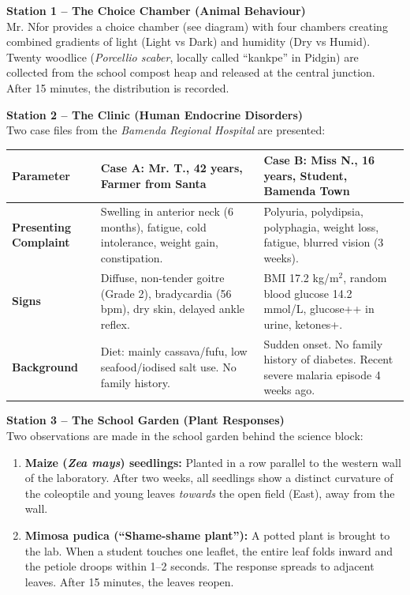 \documentclass[11pt]{article}
\begin{document}
\vspace{0.5cm}
\noindent\textbf{Station 1 -- The Choice Chamber (Animal Behaviour)}\\
Mr. Nfor provides a choice chamber (see diagram) with four chambers creating combined gradients of light (Light vs Dark) and humidity (Dry vs Humid). Twenty woodlice (\emph{Porcellio scaber}, locally called ``kankpe'' in Pidgin) are collected from the school compost heap and released at the central junction. After 15 minutes, the distribution is recorded.

\vspace{0.3cm}
\noindent\textbf{Station 2 -- The Clinic (Human Endocrine Disorders)}\\
Two case files from the \emph{Bamenda Regional Hospital} are presented:

\begin{center}
\begin{tabularx}{\linewidth}{|l|X|X|}\hline
\rowcolor{popblueL}
\textbf{Parameter} & \textbf{Case A: Mr. T., 42 years, Farmer from Santa} & \textbf{Case B: Miss N., 16 years, Student, Bamenda Town} \\\hline
\textbf{Presenting Complaint} & Swelling in anterior neck (6 months), fatigue, cold intolerance, weight gain, constipation. & Polyuria, polydipsia, polyphagia, weight loss, fatigue, blurred vision (3 weeks). \\\hline
\textbf{Signs} & Diffuse, non-tender goitre (Grade 2), bradycardia (56 bpm), dry skin, delayed ankle reflex. & BMI 17.2 kg/m$^2$, random blood glucose 14.2 mmol/L, glucose++ in urine, ketones+. \\\hline
\textbf{Background} & Diet: mainly cassava/fufu, low seafood/iodised salt use. No family history. & Sudden onset. No family history of diabetes. Recent severe malaria episode 4 weeks ago. \\\hline
\end{tabularx}
\end{center}

\vspace{0.3cm}
\noindent\textbf{Station 3 -- The School Garden (Plant Responses)}\\
Two observations are made in the school garden behind the science block:
\begin{enumerate}
    \item \textbf{Maize (\emph{Zea mays}) seedlings:} Planted in a row parallel to the western wall of the laboratory. After two weeks, all seedlings show a distinct curvature of the coleoptile and young leaves \emph{towards} the open field (East), away from the wall.
    \item \textbf{Mimosa pudica (``Shame-shame plant''):} A potted plant is brought to the lab. When a student touches one leaflet, the entire leaf folds inward and the petiole droops within 1--2 seconds. The response spreads to adjacent leaves. After 15 minutes, the leaves reopen.
\end{enumerate}
\end{document}
